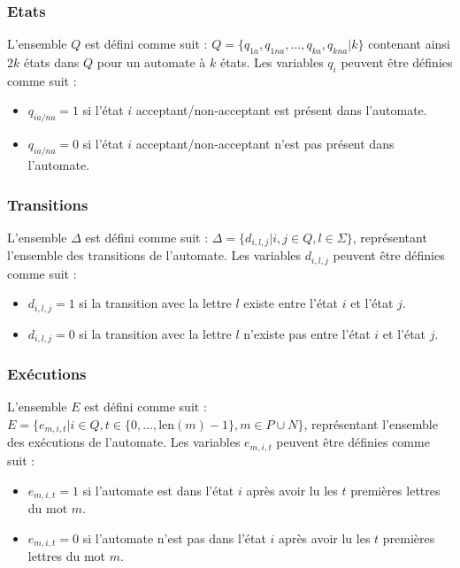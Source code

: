 \documentclass[a4paper, 12pt]{extarticle}
\begin{document}
\subsubsection{Etats}
\label{sec:etats}

\noindent L'ensemble $Q$ est défini comme suit : $Q = \{q_{1a}, q_{1na}, \dots, q_{ka}, q_{kna} | k\}$ contenant
ainsi $2k$ états dans $Q$ pour un automate à $k$ états. Les variables $q_i$ peuvent être définies comme suit : 
\begin{itemize}[label=$\bullet$]
    \item $q_{ia/na} = 1$ si l'état $i$ acceptant/non-acceptant est présent dans l'automate.
    \item $q_{ia/na} = 0$ si l'état $i$ acceptant/non-acceptant n'est pas présent dans l'automate.
\end{itemize}

\subsubsection{Transitions} 
\label{sec:transitions} 

\noindent L'ensemble $\Delta$ est défini comme suit : $\Delta = \{d_{i, l, j} | i, j \in Q, l \in \Sigma\}$, représentant
l'ensemble des transitions de l'automate. Les variables $d_{i, l, j}$ peuvent être définies comme suit : 
\begin{itemize}[label=$\bullet$]
    \item $d_{i, l, j} = 1$ si la transition avec la lettre $l$ existe entre l'état $i$ et l'état $j$.
    \item $d_{i, l, j} = 0$ si la transition avec la lettre $l$ n'existe pas entre l'état $i$ et l'état $j$.
\end{itemize} 


\subsubsection{Exécutions}
\label{sec:executions}

\noindent L'ensemble $E$ est défini comme suit : $E = \{e_{m, i, t} | i \in Q, t \in \{0,\dots,\text{len}(m)-1\}, m \in P \cup N\}$,
représentant l'ensemble des exécutions de l'automate. Les variables $e_{m, i, t}$ peuvent être définies comme suit :
\begin{itemize}[label=$\bullet$]
    \item $e_{m, i, t} = 1$ si l'automate est dans l'état $i$ après avoir lu les $t$ premières lettres du mot $m$.
    \item $e_{m, i, t} = 0$ si l'automate n'est pas dans l'état $i$ après avoir lu les $t$ premières lettres du mot $m$.
\end{itemize}
\end{document}
